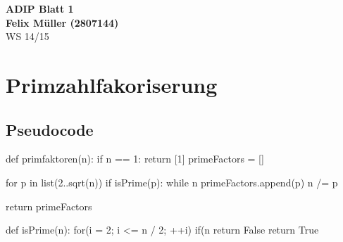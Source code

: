 \documentclass[fleqn, 12pt, a4paper]{article}
\begin{document}


  \begin{center}
  {\Large{\bfseries{ADIP Blatt 1 }}}\\[0.5cm]
  {\large{\bfseries{Felix Müller (2807144)}}}\\[0.4cm]
  WS 14/15
  \end{center}

  \section{Primzahlfakoriserung}
  \subsection{Pseudocode}
  \begin{PseudoCode}
  def primfaktoren(n):
    if n == 1: return [1]
    primeFactors = []

    for p in list(2..sqrt(n))
      if isPrime(p):
      while n %
        primeFactors.append(p)
        n /= p

    return primeFactors

  def isPrime(n):
      for(i = 2; i <= n / 2; ++i)
          if(n %
              return False
      return True
  \end{PseudoCode}
\end{document}
